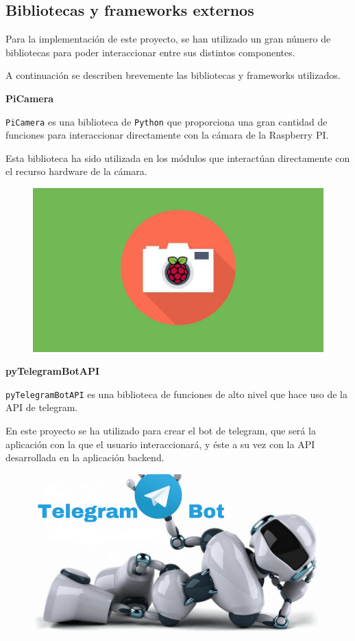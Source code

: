 \subsection{Bibliotecas y frameworks externos}

Para la implementación de este proyecto, se han utilizado un gran número de bibliotecas para poder interaccionar entre sus distintos componentes.

A continuación se describen brevemente las bibliotecas y frameworks utilizados.

\newpage

\textbf{PiCamera}

\texttt{PiCamera} \cite{ref12} es una biblioteca de \texttt{Python} que proporciona una gran cantidad de funciones para interaccionar directamente con la cámara de la Raspberry PI.

Esta biblioteca ha sido utilizada en los módulos que interactúan directamente con el recurso hardware de la cámara.


\begin{figure}[h]
	\centering
	\includegraphics[scale=0.09]{images/11}
\end{figure}

\textbf{pyTelegramBotAPI}

\texttt{pyTelegramBotAPI} \cite{ref13} es una biblioteca de funciones de alto nivel que hace uso de la API de telegram.

En este proyecto se ha utilizado para crear el bot de telegram, que será la aplicación con la que el usuario interaccionará, y éste a su vez con la API desarrollada en la aplicación backend.

\begin{figure}[h]
	\centering
	\includegraphics[scale=0.22]{images/12}
\end{figure}

